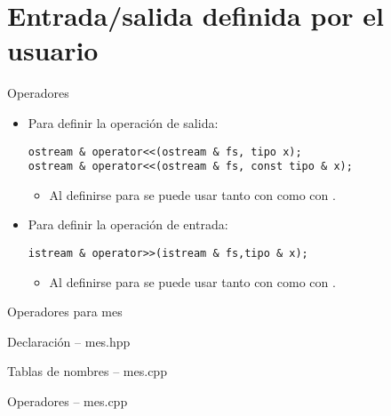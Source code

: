 \section{Entrada/salida definida por el usuario}

\begin{frame}[t,fragile]{Operadores}
\begin{itemize}
  \item Para definir la operación de salida:
\begin{lstlisting}
ostream & operator<<(ostream & fs, tipo x);
ostream & operator<<(ostream & fs, const tipo & x);
\end{lstlisting}
    \begin{itemize}
      \item Al definirse para  se puede usar
            tanto con  como con .
    \end{itemize}

  \item Para definir la operación de entrada:
\begin{lstlisting}
istream & operator>>(istream & fs,tipo & x);
\end{lstlisting}
    \begin{itemize}
      \item Al definirse para  se puede usar
            tanto con  como con .
    \end{itemize}
\end{itemize}
\end{frame}

\begin{frame}[t]{Operadores para mes}
\begin{block}{Declaración -- mes.hpp}

\end{block}
\begin{block}{Tablas de nombres -- mes.cpp}

\end{block}
\end{frame}

\begin{frame}[t]
\begin{block}{Operadores -- mes.cpp}
\mode<presentation>{

}
\end{block}
\end{frame}
